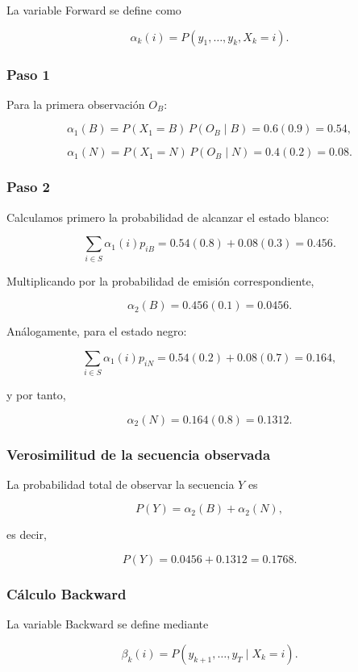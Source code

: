\documentclass[
  spanish,
  us-letterpaper,
  DIV=11,
  numbers=noendperiod]{scrreprt}
\begin{document}
La variable Forward se define como

\[
\alpha_k(i)
=
P(y_1,\ldots,y_k,X_k=i).
\]

\subsubsection{Paso 1}\label{paso-1}

Para la primera observación \(O_B\):

\[
\alpha_1(B)
=
P(X_1=B)\,P(O_B\mid B)
=
0.6(0.9)
=
0.54,
\]

\[
\alpha_1(N)
=
P(X_1=N)\,P(O_B\mid N)
=
0.4(0.2)
=
0.08.
\]

\subsubsection{Paso 2}\label{paso-2}

Calculamos primero la probabilidad de alcanzar el estado blanco:

\[
\sum_{i\in S}
\alpha_1(i)p_{iB}
=
0.54(0.8)+0.08(0.3)
=
0.456.
\]

Multiplicando por la probabilidad de emisión correspondiente,

\[
\alpha_2(B)
=
0.456(0.1)
=
0.0456.
\]

Análogamente, para el estado negro:

\[
\sum_{i\in S}
\alpha_1(i)p_{iN}
=
0.54(0.2)+0.08(0.7)
=
0.164,
\]

y por tanto,

\[
\alpha_2(N)
=
0.164(0.8)
=
0.1312.
\]

\subsubsection{Verosimilitud de la secuencia
observada}\label{verosimilitud-de-la-secuencia-observada}

La probabilidad total de observar la secuencia \(Y\) es

\[
P(Y)
=
\alpha_2(B)+\alpha_2(N),
\]

es decir,

\[
P(Y)
=
0.0456+0.1312
=
0.1768.
\]

\subsubsection{Cálculo Backward}\label{cuxe1lculo-backward}

La variable Backward se define mediante

\[
\beta_k(i)
=
P(y_{k+1},\ldots,y_T\mid X_k=i).
\]
\end{document}

